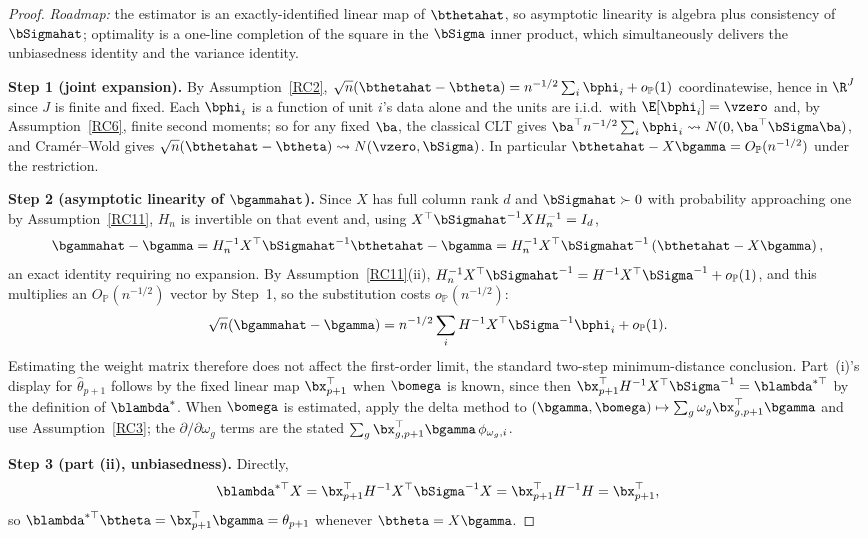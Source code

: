 \documentclass{article}
\renewcommand{\P}{\mathbb{P}}
\begin{document}
\begin{proof}
\textit{Roadmap:} the estimator is an exactly-identified linear map of $\bthetahat$, so asymptotic linearity is algebra plus consistency of $\bSigmahat$; optimality is a one-line completion of the square in the $\bSigma$ inner product, which simultaneously delivers the unbiasedness identity and the variance identity.

\textbf{Step 1 (joint expansion).} By Assumption~\ref{RC2}, $\sqrt n(\bthetahat - \btheta) = n^{-1/2}\sum_i \bphi_i + o_{\P}(1)$ coordinatewise, hence in $\R^{J}$ since $J$ is finite and fixed. Each $\bphi_i$ is a function of unit $i$'s data alone and the units are i.i.d.\ with $\E[\bphi_i]=\vzero$ and, by Assumption~\ref{RC6}, finite second moments; so for any fixed $\ba$, the classical CLT gives $\ba^{\top}n^{-1/2}\sum_i\bphi_i \leadsto N(0,\ba^{\top}\bSigma\ba)$, and Cram\'er--Wold gives $\sqrt n(\bthetahat - \btheta) \leadsto N(\vzero,\bSigma)$. In particular $\bthetahat - X\bgamma = O_{\P}(n^{-1/2})$ under the restriction.

\textbf{Step 2 (asymptotic linearity of $\bgammahat$).} Since $X$ has full column rank $d$ and $\bSigmahat \succ 0$ with probability approaching one by Assumption~\ref{RC11}, $H_n$ is invertible on that event and, using $X^{\top}\bSigmahat^{-1}X H_n^{-1} = I_d$,
\[
\bgammahat - \bgamma
= H_n^{-1}X^{\top}\bSigmahat^{-1}\bthetahat - \bgamma
= H_n^{-1}X^{\top}\bSigmahat^{-1}\left(\bthetahat - X\bgamma\right),
\]
an exact identity requiring no expansion. By Assumption~\ref{RC11}(ii), $H_n^{-1}X^{\top}\bSigmahat^{-1} = H^{-1}X^{\top}\bSigma^{-1} + o_{\P}(1)$, and this multiplies an $O_{\P}(n^{-1/2})$ vector by Step~1, so the substitution costs $o_{\P}(n^{-1/2})$:
\[
\sqrt n(\bgammahat - \bgamma) = n^{-1/2}\sum_i H^{-1}X^{\top}\bSigma^{-1}\bphi_i + o_{\P}(1).
\]
Estimating the weight matrix therefore does not affect the first-order limit, the standard two-step minimum-distance conclusion. Part~(i)'s display for $\widehat{\theta}_{p+1}$ follows by the fixed linear map $\bx_{p+1}^{\top}$ when $\bomega$ is known, since then $\bx_{p+1}^{\top}H^{-1}X^{\top}\bSigma^{-1} = \blambda^{*\top}$ by the definition of $\blambda^{*}$. When $\bomega$ is estimated, apply the delta method to $(\bgamma,\bomega)\mapsto \sum_g \omega_g\bx_{g,p+1}^{\top}\bgamma$ and use Assumption~\ref{RC3}; the $\partial/\partial\omega_g$ terms are the stated $\sum_g \bx_{g,p+1}^{\top}\bgamma\,\phi_{\omega_g,i}$.

\textbf{Step 3 (part (ii), unbiasedness).} Directly,
\[
\blambda^{*\top}X = \bx_{p+1}^{\top}H^{-1}X^{\top}\bSigma^{-1}X = \bx_{p+1}^{\top}H^{-1}H = \bx_{p+1}^{\top},
\]
so $\blambda^{*\top}\btheta = \bx_{p+1}^{\top}\bgamma = \theta_{p+1}$ whenever $\btheta = X\bgamma$.


\end{proof}
\end{document}

